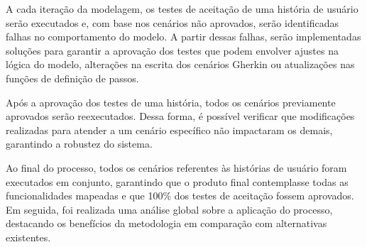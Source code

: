 A cada iteração da modelagem, os testes de aceitação de uma história de usuário serão executados e, com base nos cenários não aprovados, serão identificadas falhas 
no comportamento do modelo. A partir dessas falhas, serão implementadas soluções para garantir a aprovação dos testes que podem envolver ajustes na lógica do modelo, 
alterações na escrita dos cenários Gherkin ou atualizações nas funções de definição de passos.

Após a aprovação dos testes de uma história, todos os cenários previamente aprovados serão reexecutados. Dessa forma, é possível verificar que modificações realizadas 
para atender a um cenário específico não impactaram os demais, garantindo a robustez do sistema. 

Ao final do processo, todos os cenários referentes às histórias de usuário foram executados em conjunto, garantindo que o produto final contemplasse todas as 
funcionalidades mapeadas e que 100\% dos testes de aceitação fossem aprovados. Em seguida, foi realizada uma análise global sobre a aplicação do processo, destacando 
os benefícios da metodologia em comparação com alternativas existentes.




